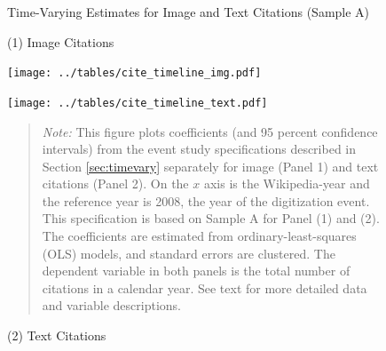 

\begin{figure}[!htbp]
\begin{center}
\caption{Time-Varying Estimates for Image and Text Citations (Sample A)}
\label{fig:ddpic_img}
\caption*{\small{(1) Image Citations}}
\texttt{[image: ../tables/cite\_timeline\_img.pdf]}

\caption*{\small{(2) Text Citations}}
\texttt{[image: ../tables/cite\_timeline\_text.pdf]}
\vspace{2mm}



\end{center}

\begin{quote}
\emph{Note:} This figure plots coefficients (and 95 percent confidence intervals) from the event study specifications described in Section \ref{sec:timevary} separately for image (Panel 1) and text citations (Panel 2). On the $x$ axis is the Wikipedia-year and the reference year is 2008, the year of the digitization event. This specification is based on Sample A for Panel (1) and (2). The coefficients are estimated from ordinary-least-squares (OLS) models, and standard errors are clustered. The dependent variable in both panels is the total number of citations in a calendar year. See text for more detailed data and variable descriptions. 

\end{quote}
\end{figure}





